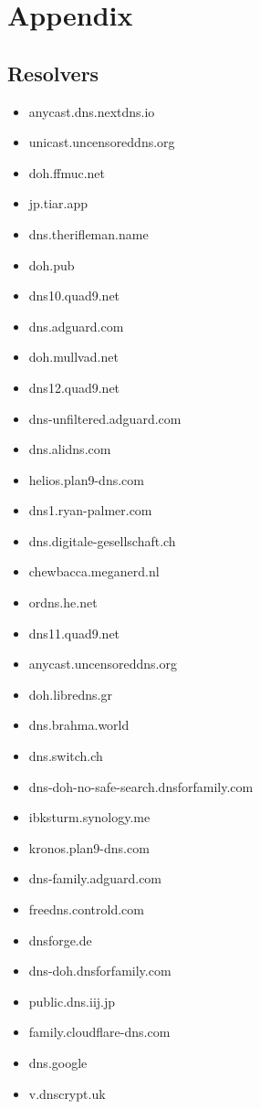 \appendix
\section{Appendix}

\subsection{Resolvers}\label{sec:resolvers}
\begin{itemize}
\item anycast.dns.nextdns.io
\item unicast.uncensoreddns.org
\item doh.ffmuc.net
\item jp.tiar.app
\item dns.therifleman.name
\item doh.pub
\item dns10.quad9.net
\item dns.adguard.com
\item doh.mullvad.net
\item dns12.quad9.net
\item dns-unfiltered.adguard.com
\item dns.alidns.com
\item helios.plan9-dns.com
\item dns1.ryan-palmer.com
\item dns.digitale-gesellschaft.ch
\item chewbacca.meganerd.nl
\item ordns.he.net
\item dns11.quad9.net
\item anycast.uncensoreddns.org
\item doh.libredns.gr
\item dns.brahma.world
\item dns.switch.ch
\item dns-doh-no-safe-search.dnsforfamily.com
\item ibksturm.synology.me
\item kronos.plan9-dns.com
\item dns-family.adguard.com
\item freedns.controld.com
\item dnsforge.de
\item dns-doh.dnsforfamily.com
\item public.dns.iij.jp
\item family.cloudflare-dns.com
\item dns.google
\item v.dnscrypt.uk

\end{itemize}
